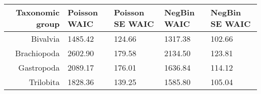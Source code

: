 \begin{table}[ht]
\centering
\begin{tabular}{r|llll}
  \hline
Taxonomic group & Poisson WAIC & Poisson SE WAIC & NegBin WAIC & NegBin SE WAIC \\ 
  \hline
Bivalvia & 1485.42 & 124.66 & 1317.38 & 102.66 \\ 
  Brachiopoda & 2602.90 & 179.58 & 2134.50 & 123.81 \\ 
  Gastropoda & 2089.17 & 176.01 & 1636.84 & 114.12 \\ 
  Trilobita & 1828.36 & 139.25 & 1585.80 & 105.04 \\ 
   \hline
\end{tabular}
\label{tab:waic}
\end{table}

